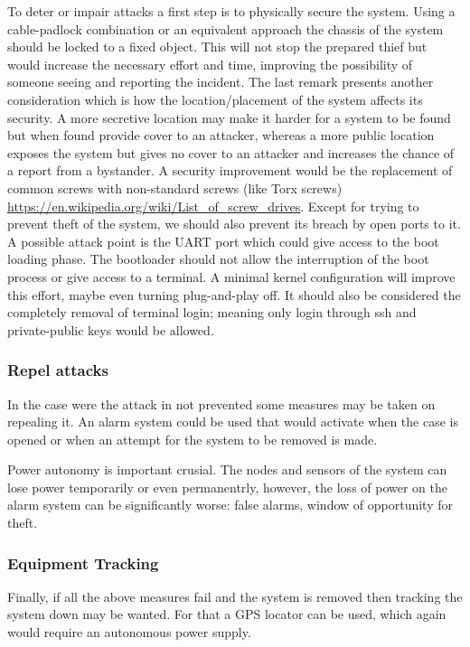 To deter or impair attacks a first step is to physically secure the system. Using a cable-padlock combination or an equivalent approach the chassis of the system should be locked to a fixed object. This will not stop the prepared thief  but would increase the necessary effort and time, improving the possibility of someone seeing and reporting the incident. The last remark presents another consideration which is how the location/placement of the system affects its security. A more secretive location may make it harder for a system to be found but when found provide cover to an attacker, whereas a more public location exposes the system but gives no cover to an attacker and increases the chance of a report from a bystander. A security improvement would be the replacement of common screws with non-standard screws (like Torx screws) \url{https://en.wikipedia.org/wiki/List_of_screw_drives}.
Except for trying to prevent theft of the system, we should also prevent its breach by open ports to it. A possible attack point is the UART port which could give access to the boot loading phase. The bootloader should not allow the interruption of the boot process or give access to a terminal. A minimal kernel configuration will improve this effort, maybe even turning plug-and-play off. It should also be considered the completely removal of terminal login; meaning only login through ssh and private-public keys would be allowed.

\subsubsection{Repel attacks}
In the case were the attack in not prevented some measures may be taken on repealing it. An alarm system could be used that would activate when the case is opened or when an attempt for the system to be removed is made.

Power autonomy is important crusial. The nodes and sensors of the system can lose power temporarily or even permanentrly, however, the loss of power on the alarm system can be significantly worse: false alarms, window of opportunity for theft.

\subsubsection{Equipment Tracking}
Finally, if all the above measures fail and the system is removed then tracking the system down may be wanted. For that a GPS locator can be used, which again would require an autonomous power supply.

